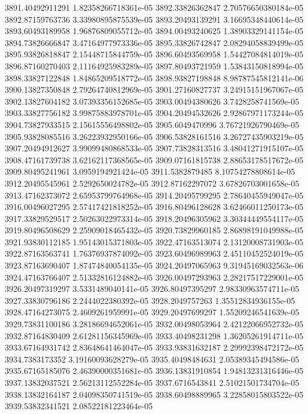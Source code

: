 {3891.40492911291 1.82358266718361e-05
3892.33826362847 2.70576650380184e-05
3892.87159763736 3.33980895875539e-05
3893.20493139291 3.16695348440614e-05
3893.60493189958 1.96876809055712e-05
3894.00493240625 1.38903329141154e-05
3894.73826666847 3.47164977973336e-05
3895.33826742847 2.08294058839499e-05
3895.93826818847 2.15448715844759e-05
3896.60493569958 1.54427084814019e-05
3896.87160270403 2.11164925983289e-05
3897.80493721959 1.53843150818994e-05
3898.33827122848 1.84865209518772e-05
3898.93827198848 8.98787545812141e-06
3900.13827350848 2.79264740812969e-05
3901.27160827737 3.24915151967067e-05
3902.13827604182 3.07393356152685e-05
3903.00494380626 3.7428258741569e-05
3903.33827756182 3.99875883978701e-05
3904.20494532626 2.92867971173244e-05
3904.73827933515 2.15615556498802e-05
3905.6049470996 3.76721926790469e-05
3905.93828085516 3.26223932950166e-05
3906.53828161516 3.26727435903219e-05
3907.20494912627 3.99099480868533e-05
3907.73828313516 3.48041271915107e-05
3908.47161739738 3.62162117368565e-05
3909.07161815738 2.88653178517672e-05
3909.80495241961 3.0959194921424e-05
3911.5382879485 8.10754278808614e-05
3912.20495545961 2.5292650024782e-05
3912.87162297072 3.67826703001658e-05
3913.47162373072 2.65953799764968e-05
3914.20495799295 2.78640455949047e-05
3916.00496027295 2.57417421818252e-05
3916.80496128628 3.62466011250173e-05
3917.33829529517 2.50263022973314e-05
3918.20496305962 3.30344449554117e-05
3919.80496508629 2.25909018465432e-05
3920.73829960185 2.86898191049988e-05
3921.93830112185 1.95143015371803e-05
3922.47163513074 2.13120008731903e-05
3922.87163563741 1.76376937874092e-05
3923.60496989963 2.45110452524019e-05
3923.87163690407 1.87474840054135e-05
3924.20497065963 9.31945169032563e-06
3924.47163766407 2.51332816124882e-05
3926.00497293963 2.28217517229001e-05
3926.20497319297 3.5331489040141e-05
3926.80497395297 2.98330963574711e-05
3927.33830796186 2.2444022380392e-05
3928.2049757263 1.35512834936155e-05
3928.47164273075 2.4609261959991e-05
3929.20497699297 1.55209246541639e-05
3929.73831100186 3.28186694652061e-05
3932.00498053964 2.42122066952732e-05
3932.87164830409 2.61281156345969e-05
3933.40498231298 1.36205261914711e-05
3933.67164931742 2.83648641464047e-05
3933.93831632187 2.29992398472172e-05
3934.7383173352 3.19160093628279e-05
3935.40498484631 2.05389345494586e-05
3935.67165185076 2.46390000351681e-05
3936.13831910854 1.94813231316446e-05
3937.13832037521 2.56213112552284e-05
3937.6716543841 2.51021501734704e-05
3938.13832164187 2.04098350741519e-05
3938.60498889965 3.22858015803522e-05
3939.53832341521 2.08522181223464e-05
}
